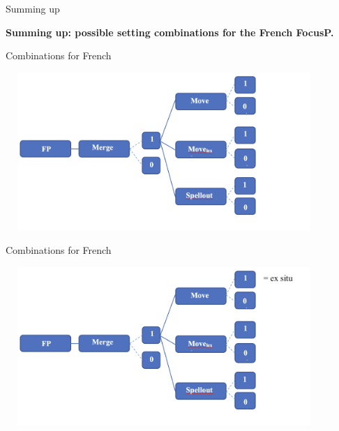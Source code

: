 \documentclass[lesson_slides]{subfiles}
\begin{document}
\begin{frame}{Summing up}
    \begin{center}
        \textbf{Summing up: possible setting combinations for the French FocusP.}
    \end{center}
\end{frame}
\begin{frame}[c]{Combinations for French}

    \begin{center}
        \includegraphics[width=12cm, height=6cm]{images/combinationsfrenchb.png}
    \end{center}

\end{frame}
\begin{frame}[c]{Combinations for French}

    \begin{center}
        \includegraphics[width=12cm, height=6cm]{images/combinationsfrench1.png}
    \end{center}

\end{frame}
\end{document}

